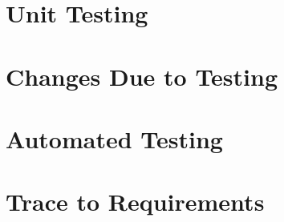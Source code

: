 \documentclass[12pt, titlepage]{article}
\begin{document}
\section{Unit Testing}

\section{Changes Due to Testing}

\section{Automated Testing}
		
\section{Trace to Requirements}
\end{document}
